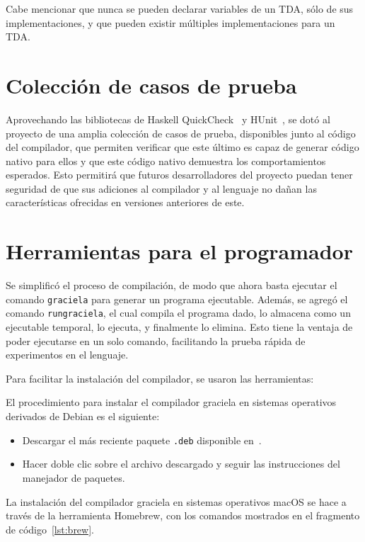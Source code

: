 Cabe mencionar que nunca se pueden declarar variables de un TDA, sólo de sus 
implementaciones, y que pueden existir múltiples implementaciones para un TDA.


\section{Colección de casos de prueba}

Aprovechando las bibliotecas de Haskell QuickCheck~\cite{quickcheck} y
HUnit~\cite{hunit}, se dotó al proyecto de una amplia colección de casos de
prueba, disponibles junto al código del compilador, que permiten verificar que
este último es capaz de generar código nativo para ellos y que este código
nativo demuestra los comportamientos esperados. Esto permitirá que futuros
desarrolladores del proyecto puedan tener seguridad de que sus adiciones al
compilador y al lenguaje no dañan las características ofrecidas en versiones
anteriores de este.

\section{Herramientas para el programador}

Se simplificó el proceso de compilación, de modo que ahora basta ejecutar el
comando \texttt{graciela} para generar un programa ejecutable. Además, se agregó
el comando \texttt{rungraciela}, el cual compila el programa dado, lo almacena
como un ejecutable temporal, lo ejecuta, y finalmente lo elimina. Esto tiene la
ventaja de poder ejecutarse en un solo comando, facilitando la prueba rápida de
experimentos en el lenguaje.

Para facilitar la instalación del compilador, se usaron las herramientas:

\begin{description}[leftmargin=!,labelwidth=\widthof{\bfseries Homebrew}]

  \item [Deb] El procedimiento para instalar el compilador graciela en sistemas 
    operativos derivados de Debian es el siguiente:
    \begin{itemize}
      \item Descargar el más reciente paquete \texttt{.deb} disponible
        en~\cite{gracieladeb}.
      \item Hacer doble clic sobre el archivo descargado y seguir las 
        instrucciones del manejador de paquetes.
    \end{itemize}

  \item [Homebrew] La instalación del compilador graciela en sistemas
    operativos macOS se hace a través de la herramienta Homebrew,
    con los comandos mostrados en el fragmento de código~\ref{lst:brew}.

\end{description}

